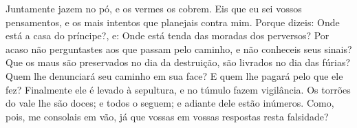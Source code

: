 {  Juntamente jazem no pó, e os vermes os cobrem.
  Eis que eu sei vossos pensamentos, e os mais intentos que planejais contra mim.
  Porque dizeis: Onde está a casa do príncipe?, e: Onde está tenda das moradas dos perversos?
  Por acaso não perguntastes aos que passam pelo caminho, e não conheceis seus sinais?
  Que os maus são preservados no dia da destruição,
{} são livrados no dia das fúrias?
  Quem lhe denunciará seu caminho em sua face? E quem lhe pagará pelo que ele fez?
  Finalmente ele é levado à sepultura, e no túmulo fazem vigilância.
  Os torrões do vale lhe são doces; e todos o seguem; e adiante dele estão inúmeros.
  Como, pois, me consolais em vão, já que vossas em vossas respostas
{} resta falsidade?
\par }

